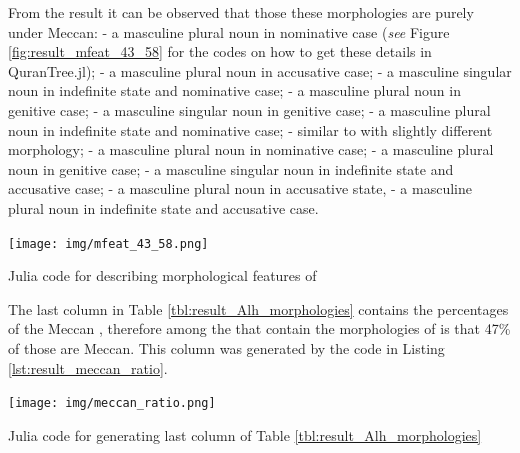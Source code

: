 From the result it can be observed that those these morphologies are purely under Meccan:    - a masculine plural noun in nominative case (\textit{see} Figure \ref{fig:result_mfeat_43_58} for the codes on how to get these details in QuranTree.jl);   - a masculine plural noun in accusative case;   - a masculine singular noun in indefinite state and nominative case;   - a masculine plural noun in genitive case;   - a masculine singular noun in genitive case;   - a masculine plural noun in indefinite state and nominative case;   - similar to   with slightly different morphology;   - a masculine plural noun in nominative case;   - a masculine plural noun in genitive case;   - a masculine singular noun in indefinite state and accusative case;   - a masculine plural noun in accusative state,   - a masculine plural noun in indefinite state and accusative case.

\begin{listing2}[!t]
    \centering
    \texttt{[image: img/mfeat\_43\_58.png]}
    \caption{Julia code for describing morphological features of  }
    \label{lst:result_mfeat_43_58}
\end{listing2}

The last column in Table \ref{tbl:result_Alh_morphologies} contains the percentages of the Meccan  , therefore among the   that contain the morphologies of   is that 47\% of those are Meccan. This column was generated by the code in Listing \ref{lst:result_meccan_ratio}.

\begin{listing2}[!t]
    \centering
    \texttt{[image: img/meccan\_ratio.png]}
    \caption{Julia code for generating last column of Table \ref{tbl:result_Alh_morphologies}}
    \label{lst:result_meccan_ratio}
\end{listing2}

